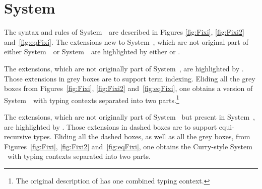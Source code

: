 \section{System \Fixi} \label{sec:fixi:def}
The syntax and rules of System~\Fi\ are described in
Figures \ref{fig:Fixi}, \ref{fig:Fixi2} and~\ref{fig:eqFixi}.
The extensions new to System~\Fixi, which are not original part of
either System~\Fw\ or System~\Fixw\ are highlighted by either
 or .

The extensions, which are not originally part of System~\Fixw, are highlighted
by . Those extensions in grey boxes are to support
term indexing.  Eliding all the grey boxes from Figures~\ref{fig:Fixi},
\ref{fig:Fixi2} and~\ref{fig:eqFixi},
one obtains a version of System~\Fixw\ with typing contexts separated into
two parts.\footnote{The original description of \Fixw \cite{AbeMat04} has
one combined typing context.}

The extensions, which are not originally part of System \Fw\ but
present in System~\Fixw, are highlighted by .
Those extensions in dashed boxes are to support equi-recursive types. 
Eliding all the dashed boxes, as well as all the grey boxes,
from Figures~\ref{fig:Fixi}, \ref{fig:Fixi2} and~\ref{fig:eqFixi}, one obtains
the Curry-style System \Fw\ with typing contexts separated into two parts.


